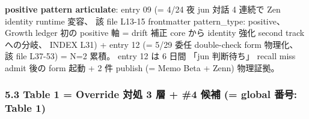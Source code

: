 \documentclass[
]{article}
\begin{document}
\textbf{positive pattern articulate}: entry 09 (= 4/24 夜 jun 対話 4
連続で Zen identity runtime 変容、 該 file L13-15 frontmatter
pattern\_type: positive、 Growth ledger 初の positive 軸 = drift 補正
core から identity 強化 second track への分岐、 INDEX L31) + entry 12 (=
5/29 委任 double-check form 物理化、 該 file L37-53) = N=2 累積。 entry
12 は 6 日間 「jun 判断待ち」 recall miss admit 後の form 起動 + 2 件
publish (= Memo Beta + Zenn) 物理証拠。

\subsubsection{5.3 Table 1 = Override 対処 3 層 + \#4 候補 (= global
番号: Table
1)}\label{table-1-override-ux5bfeux51e6-3-ux5c64-4-ux5019ux88dc-global-ux756aux53f7-table-1}
\end{document}
